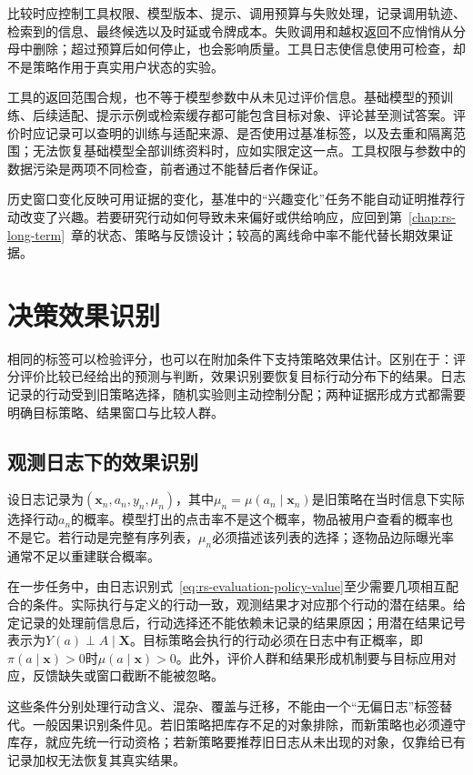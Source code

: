 比较时应控制工具权限、模型版本、提示、调用预算与失败处理，记录调用轨迹、检索到的信息、最终候选以及时延或令牌成本。失败调用和越权返回不应悄悄从分母中删除；超过预算后如何停止，也会影响质量。工具日志使信息使用可检查，却不是策略作用于真实用户状态的实验。

工具的返回范围合规，也不等于模型参数中从未见过评价信息。基础模型的预训练、后续适配、提示示例或检索缓存都可能包含目标对象、评论甚至测试答案。评价时应记录可以查明的训练与适配来源、是否使用过基准标签，以及去重和隔离范围；无法恢复基础模型全部训练资料时，应如实限定这一点。工具权限与参数中的数据污染是两项不同检查，前者通过不能替后者作保证。

历史窗口变化反映可用证据的变化，基准中的“兴趣变化”任务不能自动证明推荐行动改变了兴趣。若要研究行动如何导致未来偏好或供给响应，应回到第~\ref{chap:rs-long-term}~章的状态、策略与反馈设计；较高的离线命中率不能代替长期效果证据。

\section{决策效果识别}
\label{sec:rs-evaluation-effects}

相同的标签可以检验评分，也可以在附加条件下支持策略效果估计。区别在于：评分评价比较已经给出的预测与判断，效果识别要恢复目标行动分布下的结果。日志记录的行动受到旧策略选择，随机实验则主动控制分配；两种证据形成方式都需要明确目标策略、结果窗口与比较人群。

\subsection{观测日志下的效果识别}
\label{sec:rs-evaluation-logged}

设日志记录为$(\bm x_n,a_n,y_n,\mu_n)$，其中$\mu_n=\mu(a_n\mid\bm x_n)$是旧策略在当时信息下实际选择行动$a_n$的概率。模型打出的点击率不是这个概率，物品被用户查看的概率也不是它。若行动是完整有序列表，$\mu_n$必须描述该列表的选择；逐物品边际曝光率通常不足以重建联合概率。

在一步任务中，由日志识别式~\eqref{eq:rs-evaluation-policy-value}至少需要几项相互配合的条件。实际执行与定义的行动一致，观测结果才对应那个行动的潜在结果。给定记录的处理前信息后，行动选择还不能依赖未记录的结果原因；用潜在结果记号表示为$Y(a)\perp A\mid\bm X$。目标策略会执行的行动必须在日志中有正概率，即$\pi(a\mid\bm x)>0$时$\mu(a\mid\bm x)>0$。此外，评价人群和结果形成机制要与目标应用对应，反馈缺失或窗口截断不能被忽略。

这些条件分别处理行动含义、混杂、覆盖与迁移，不能由一个“无偏日志”标签替代。一般因果识别条件见。若旧策略把库存不足的对象排除，而新策略也必须遵守库存，就应先统一行动资格；若新策略要推荐旧日志从未出现的对象，仅靠给已有记录加权无法恢复其真实结果。

